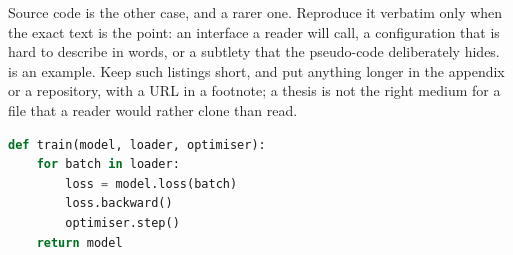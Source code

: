 
Source code is the other case, and a rarer one. Reproduce it verbatim only
when the exact text is the point: an interface a reader will call, a
configuration that is hard to describe in words, or a subtlety that the
pseudo-code deliberately hides.  is an example. Keep
such listings short, and put anything longer in the appendix or a repository,
with a URL in a footnote; a thesis is not the right medium for a file that a
reader would rather clone than read.

\begin{lstlisting}[language=Python,caption={A training loop, reproduced verbatim. Listings take a caption and a label like any other float.},label={lst:training_loop}]
def train(model, loader, optimiser):
    for batch in loader:
        loss = model.loss(batch)
        loss.backward()
        optimiser.step()
    return model
\end{lstlisting}
